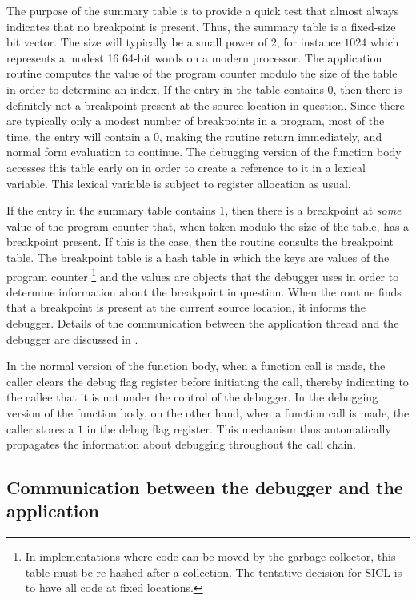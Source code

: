 The purpose of the summary table is to provide a quick test that
almost always indicates that no breakpoint is present.  Thus, the
summary table is a fixed-size bit vector.  The size will typically be
a small power of $2$, for instance $1024$ which represents a modest 16
64-bit words on a modern processor.  The application routine computes
the value of the program counter modulo the size of the table in order
to determine an index.  If the entry in the table contains $0$, then
there is definitely not a breakpoint present at the source location in
question.  Since there are typically only a modest number of
breakpoints in a program, most of the time, the entry will contain a
$0$, making the routine return immediately, and normal form evaluation
to continue.  The debugging version of the function body accesses this
table early on in order to create a reference to it in a lexical
variable.  This lexical variable is subject to register allocation as
usual.

If the entry in the summary table contains $1$, then there is a
breakpoint at \emph{some} value of the program counter that, when
taken modulo the size of the table, has a breakpoint present.  If this
is the case, then the routine consults the breakpoint table.
The breakpoint table is a hash table in which the keys are values of
the program counter%
\footnote{In implementations where code can be moved by the garbage
  collector, this table must be re-hashed after a collection.  The
  tentative decision for SICL is to have all code at fixed locations.}
and the values are objects that the debugger uses in order to
determine information about the breakpoint in question.  When the
routine finds that a breakpoint is present at the current source
location, it informs the debugger.  Details of the communication
between the application thread and the debugger are discussed in
.

In the normal version of the function body, when a function call is
made, the caller clears the debug flag register before initiating the
call, thereby indicating to the callee that it is not under the
control of the debugger.  In the debugging version of the function
body, on the other hand, when a function call is made, the caller
stores a $1$ in the debug flag register.  This mechanism thus
automatically propagates the information about debugging throughout
the call chain.

\subsection{Communication between the debugger and the application}
\label{sec-debugger-application-communication}

